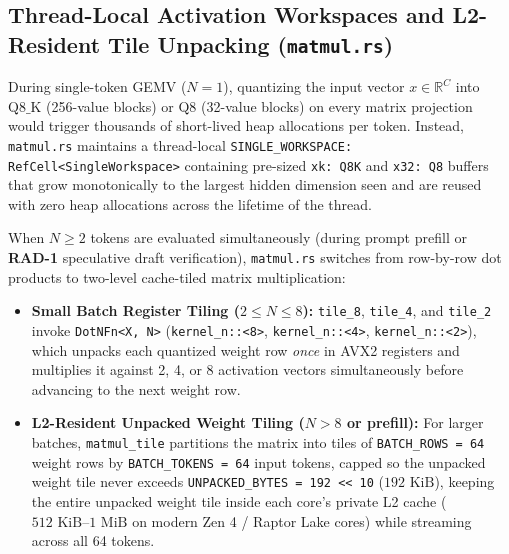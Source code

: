 \documentclass[10pt,a4paper]{article}
\theoremstyle{swzstyle}
\newcommand{\code}[1]{\texttt{#1}}
\begin{document}
\subsection{Thread-Local Activation Workspaces and L2-Resident Tile Unpacking (\texttt{matmul.rs})}

During single-token GEMV ($N=1$), quantizing the input vector $x \in \mathbb{R}^C$ into $\text{Q8\_K}$ (256-value blocks) or $\text{Q8}$ (32-value blocks) on every matrix projection would trigger thousands of short-lived heap allocations per token. Instead, \code{matmul.rs} maintains a thread-local \code{SINGLE\_WORKSPACE: RefCell<SingleWorkspace>} containing pre-sized \code{xk: Q8K} and \code{x32: Q8} buffers that grow monotonically to the largest hidden dimension seen and are reused with zero heap allocations across the lifetime of the thread.

When $N \ge 2$ tokens are evaluated simultaneously (during prompt prefill or \textbf{RAD-1} speculative draft verification), \code{matmul.rs} switches from row-by-row dot products to two-level cache-tiled matrix multiplication:
\begin{itemize}
  \item \textbf{Small Batch Register Tiling ($2 \le N \le 8$):} \code{tile\_8}, \code{tile\_4}, and \code{tile\_2} invoke \code{DotNFn<X, N>} (\code{kernel\_n::<8>}, \code{kernel\_n::<4>}, \code{kernel\_n::<2>}), which unpacks each quantized weight row \emph{once} in AVX2 registers and multiplies it against 2, 4, or 8 activation vectors simultaneously before advancing to the next weight row.
  \item \textbf{L2-Resident Unpacked Weight Tiling ($N > 8$ or prefill):} For larger batches, \code{matmul\_tile} partitions the matrix into tiles of \code{BATCH\_ROWS = 64} weight rows by \code{BATCH\_TOKENS = 64} input tokens, capped so the unpacked weight tile never exceeds \code{UNPACKED\_BYTES = 192 << 10} ($192\text{ KiB}$), keeping the entire unpacked weight tile inside each core's private L2 cache ($512\text{ KiB}\text{--}1\text{ MiB}$ on modern Zen 4 / Raptor Lake cores) while streaming across all 64 tokens.
\end{itemize}
\end{document}
